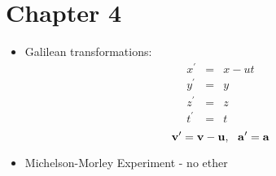 \documentclass[12pt]{article}
\begin{document}
\section*{Chapter 4}
\begin{itemize}
\item Galilean transformations:
\begin{eqnarray}
x^\prime &= &x - ut \\
y^\prime &= &y \\
z^\prime &= &z \\
t^\prime &= &t
\end{eqnarray}
\begin{equation}
\bf{v}^\prime = \bf{v} - \bf{u},~~\bf{a}^\prime = \bf{a}
\end{equation}

\item Michelson-Morley Experiment - no ether


\end{itemize}
\end{document}

